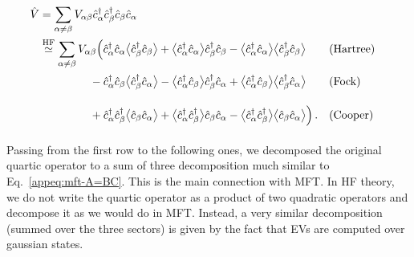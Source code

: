 \begin{align}
	\hat V &= \sum_{\alpha\neq\beta} V_{\alpha\beta} \hat c_\alpha^\dagger \hat c_\beta^\dagger \hat c_\beta \hat c_\alpha \label{appeq:mft-V-decomposition} \\
	&\HFsimeq \sum_{\alpha\neq\beta} V_{\alpha\beta} \Big(
	\hat c_\alpha^\dagger \hat c_\alpha \big\langle \hat c_\beta^\dagger \hat c_\beta \big\rangle + \big\langle \hat c_\alpha^\dagger \hat c_\alpha \big\rangle \hat c_\beta^\dagger \hat c_\beta - \big\langle \hat c_\alpha^\dagger \hat c_\alpha \big\rangle  \big\langle \hat c_\beta^\dagger \hat c_\beta \big\rangle &&(\text{Hartree}) \nonumber\\
	&\phantom{\simeq \sum_{\alpha\neq\beta} V_{\alpha\beta}}
	- \hat c_\alpha^\dagger \hat c_\beta \big\langle \hat c_\beta^\dagger \hat c_\alpha \big\rangle - \big\langle \hat c_\alpha^\dagger \hat c_\beta \big\rangle \hat c_\beta^\dagger \hat c_\alpha + \big\langle \hat c_\alpha^\dagger \hat c_\beta \big\rangle  \big\langle \hat c_\beta^\dagger \hat c_\alpha \big\rangle &&(\text{Fock}) \nonumber\\
	&\phantom{\simeq \sum_{\alpha\neq\beta} V_{\alpha\beta}}
	+ \hat c_\alpha^\dagger \hat c_\beta^\dagger \big\langle \hat c_\beta \hat c_\alpha \big\rangle + \big\langle \hat c_\alpha^\dagger \hat c_\beta^\dagger \big\rangle \hat c_\beta \hat c_\alpha - \big\langle \hat c_\alpha^\dagger \hat c_\beta^\dagger \big\rangle  \big\langle \hat c_\beta \hat c_\alpha \big\rangle
	\Big) \, . &&(\text{Cooper}) \nonumber
\end{align}
Passing from the first row to the following ones, we decomposed the original quartic operator to a sum of three decomposition much similar to Eq.~\eqref{appeq:mft-A=BC}. This is the main connection with MFT. In HF theory, we do not write the quartic operator as a product of two quadratic operators and decompose it as we would do in MFT. Instead, a very similar decomposition (summed over the three sectors) is given by the fact that EVs are computed over gaussian states.